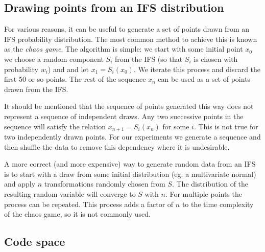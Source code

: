 \documentclass[10pt,a4paper,oneside]{article}
\theoremstyle{definition}
\begin{document}
\subsection*{Drawing points from an IFS distribution}

For various reasons, it can be useful to generate a set of points drawn from an IFS probability distribution. The most common method to achieve this is known as the \emph{chaos game}. The algorithm is simple: we start with some initial point $x_0$ we choose a random component $S_i$ from the IFS (so that $S_i$ is chosen with probability $w_i$) and and let $x_1 = S_i(x_0)$. We iterate this process and discard the first 50 or so points. The rest of the sequence $x_n$ can be used as a set of points drawn from the IFS.

It should be mentioned that the sequence of points generated this way does not represent a sequence of independent draws. Any two successive points in the sequence will satisfy the relation $x_{n+1} = S_i(x_{n})$ for some $i$. This is not true for two independently drawn points. For our experiments we generate a sequence and then shuffle the data to remove this dependency where it is undesirable.

A more correct (and more expensive) way to generate random data from an IFS is to start with a draw from some initial distribution (eg. a multivariate normal) and apply $n$ transformations randomly chosen from $S$. The distribution of the resulting random variable will converge to $S$ with $n$. For multiple points the process can be repeated. This process adds a factor of $n$ to the time complexity of the chaos game, so it is not commonly used. 

\subsection*{Code space}
\label{sec:code-space}
\end{document}
